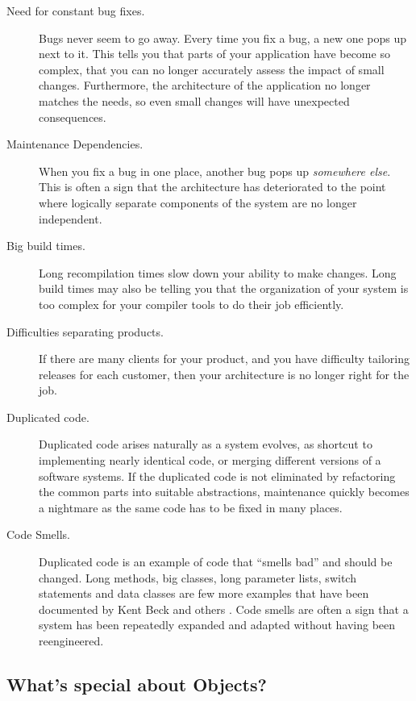 \documentclass[a4paper,10pt,twoside]{book}
\begin{document}
\begin{description}
  \item[Need for constant bug fixes.]
Bugs never seem to go away. Every time you fix a bug, a new one pops up next to it. This tells you that parts of your application have become so complex, that you can no longer accurately assess the impact of small changes. Furthermore, the architecture of the application no longer matches the needs, so even small changes will have unexpected consequences.

  \item[Maintenance Dependencies.]
When you fix a bug in one place, another bug pops up \emph{somewhere else}. This is often a sign that the architecture has deteriorated to the point where logically separate components of the system are no longer independent. 

  \item[Big build times.]
Long recompilation times slow down your ability to make changes. Long build times may also be telling you that the organization of your system is too complex for your compiler tools to do their job efficiently. 

  \item[Difficulties separating products.]
If there are many clients for your product, and you have difficulty tailoring releases for each customer, then your architecture is no longer right for the job.

  \item[Duplicated code.] 
Duplicated code arises naturally as a system evolves, as shortcut to implementing nearly identical code, or merging different versions of a software systems. If the duplicated code is not eliminated by refactoring the common parts into suitable abstractions, maintenance quickly becomes a nightmare as the same code has to be fixed in many places.

  \item[Code Smells.] 
Duplicated code is an example of code that ``smells bad'' and should be changed. Long methods, big classes, long parameter lists, switch statements and data classes are few more examples that have been documented by Kent Beck and others \cite{Fowl99a}. Code smells are often a sign that a system has been repeatedly expanded and adapted without having been reengineered.
\end{description}

\subsection*{What's special about Objects?}
\end{document}
